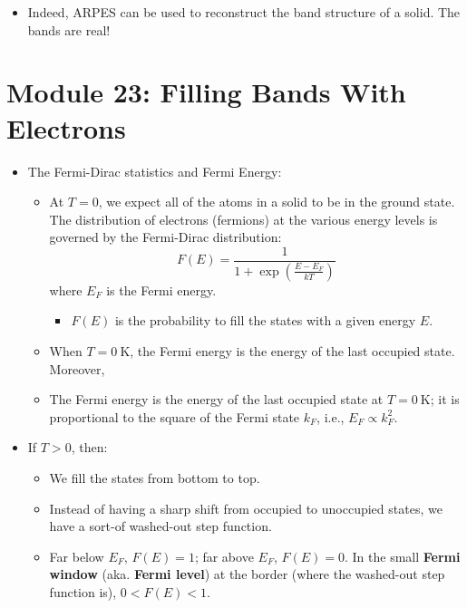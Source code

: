 \documentclass[../notes.tex]{subfiles}
\begin{document}
\begin{itemize}
    \begin{itemize}
        \item Indeed, ARPES can be used to reconstruct the band structure of a solid. The bands are real!
    \end{itemize}
\end{itemize}



\section{Module 23: Filling Bands With Electrons}
\begin{itemize}
    \item The Fermi-Dirac statistics and Fermi Energy:
    \begin{itemize}
        \item At $T=0$, we expect all of the atoms in a solid to be in the ground state. The distribution of electrons (fermions) at the various energy levels is governed by the Fermi-Dirac distribution:
        \begin{equation*}
            F(E) = \frac{1}{1+\exp\left( \frac{E-E_F}{kT} \right)}
        \end{equation*}
        where $E_F$ is the Fermi energy.
        \begin{itemize}
            \item $F(E)$ is the probability to fill the states with a given energy $E$.
        \end{itemize}
        \item When $T=\SI{0}{\kelvin}$, the Fermi energy is the energy of the last occupied state. Moreover, 
        \item The Fermi energy is the energy of the last occupied state at $T=\SI{0}{\kelvin}$; it is proportional to the square of the Fermi state $k_F$, i.e., $E_F\propto k_F^2$.
    \end{itemize}
    \item If $T>0$, then:
    \begin{itemize}
        \item We fill the states from bottom to top.
        \item Instead of having a sharp shift from occupied to unoccupied states, we have a sort-of washed-out step function.
        \item Far below $E_F$, $F(E)=1$; far above $E_F$, $F(E)=0$. In the small \textbf{Fermi window} (aka. \textbf{Fermi level}) at the border (where the washed-out step function is), $0<F(E)<1$.

\end{itemize}
\end{itemize}
\end{document}
